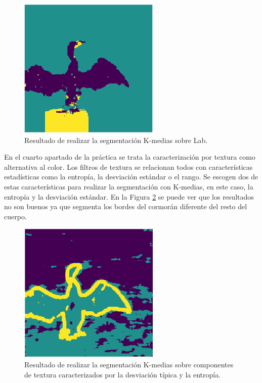 \documentclass[a4paper,12pt]{report}
\begin{document}
\begin{figure}[h]
\centering
\includegraphics[width=0.6\textwidth]{imagenes/segmentacionlab}
\caption{Resultado de realizar la segmentación K-medias sobre Lab.}
\label{segmentacionlab}
\end{figure}

En el cuarto apartado de la práctica se trata la caracterización por textura como alternativa al color. Los filtros de textura se relacionan todos con características estadísticas como la entropía, la desviación estándar o el rango. Se escogen dos de estas características para realizar la segmentación con K-medias, en este caso, la entropía y la desviación estándar. En la Figura \ref{segmentacionse} se puede ver que los resultados no son buenos ya que segmenta los bordes del cormorán diferente del resto del cuerpo.\\
\begin{figure}[h]
\centering
\includegraphics[width=0.6\textwidth]{imagenes/segmentacionse}
\caption{Resultado de realizar la segmentación K-medias sobre componentes de textura caracterizados por la desviación típica y la entropía.}
\label{segmentacionse}
\end{figure}
\end{document}
